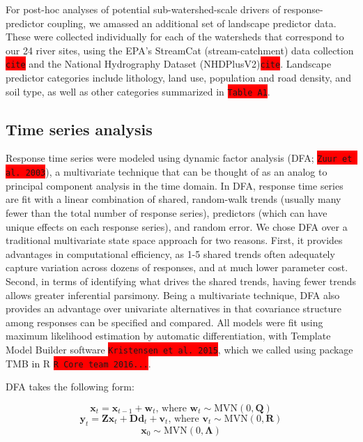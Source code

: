 \documentclass{article}
\begin{document}
For post-hoc analyses of potential sub-watershed-scale drivers of response-predictor coupling, we amassed an additional set of landscape predictor data. These were collected individually for each of the watersheds that correspond to our 24 river sites, using the EPA's StreamCat (stream-catchment) data collection \colorbox{red}{\lstinline{cite}} and the National Hydrography Dataset (NHDPlusV2)\colorbox{red}{\lstinline{cite}}. Landscape predictor categories include lithology, land use, population and road density, and soil type, as well as other categories summarized in \colorbox{red}{\lstinline{Table A1}}.

\subsection*{Time series analysis}
Response time series were modeled using dynamic factor analysis (DFA; \colorbox{red}{\lstinline{Zuur et al. 2003}}), a multivariate technique that can be thought of as an analog to principal component analysis in the time domain. In DFA, response time series are fit with a linear combination of shared, random-walk trends (usually many fewer than the total number of response series), predictors (which can have unique effects on each response series), and random error. We chose DFA over a traditional multivariate state space approach for two reasons. First, it provides advantages in computational efficiency, as 1-5 shared trends often adequately capture variation across dozens of responses, and at much lower parameter cost. Second, in terms of identifying what drives the shared trends, having fewer trends allows greater inferential parsimony. Being a multivariate technique, DFA also provides an advantage over univariate alternatives in that covariance structure among responses can be specified and compared. All models were fit using maximum likelihood estimation by automatic differentiation, with Template Model Builder software \colorbox{red}{\lstinline{Kristensen et al. 2015}}, which we called using package TMB in R \colorbox{red}{\lstinline{R Core team 2016...}}.

DFA takes the following form:

\begin{equation}
    \textbf{x}_t = \textbf{x}_{t-1} + \textbf{w}_t\textrm{, where } \textbf{w}_t \sim \textrm{MVN}(0,\textbf{Q})
\end{equation}
\begin{equation}
    \textbf{y}_t = \textbf{Zx}_t + \textbf{Dd}_t + \textbf{v}_t\textrm{, where } \textbf{v}_t \sim \textrm{MVN}(0,\textbf{R})
\end{equation}
\begin{equation}
    \textbf{x}_0 \sim \textrm{MVN}(0,\bm{\Lambda})
\end{equation}
\end{document}
